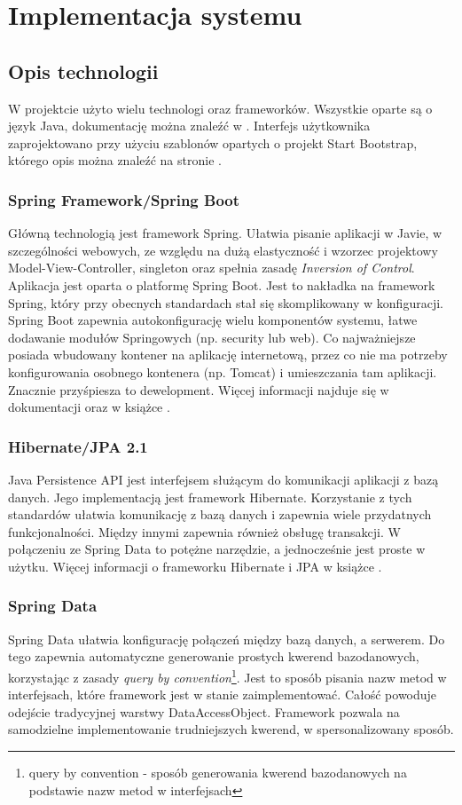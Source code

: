 \chapter{Implementacja systemu}
\thispagestyle{chapterBeginStyle}

\section{Opis technologii}
W projektcie użyto wielu technologi oraz frameworków. Wszystkie oparte są o język Java, dokumentację można znaleźć w \cite{Java-doc}. Interfejs użytkownika zaprojektowano przy użyciu szablonów opartych o projekt Start Bootstrap, którego opis można znaleźć na stronie \cite{sb}. 

\subsection{Spring Framework/Spring Boot}
Główną technologią jest framework Spring. Ułatwia pisanie aplikacji w Javie, w szczególności webowych, ze względu na dużą elastyczność i wzorzec projektowy Model-View-Controller, singleton oraz spełnia zasadę \textit{Inversion of Control}. Aplikacja jest oparta o platformę Spring Boot. Jest to nakładka na framework Spring, który przy obecnych standardach stał się skomplikowany w konfiguracji. Spring Boot zapewnia autokonfigurację wielu komponentów systemu, łatwe dodawanie modułów Springowych (np. security lub web). Co najważniejsze posiada wbudowany kontener na aplikację internetową, przez co nie ma potrzeby konfigurowania osobnego kontenera (np. Tomcat) i umieszczania tam aplikacji. Znacznie przyśpiesza to dewelopment. Więcej informacji najduje się w dokumentacji \cite{springb-docs} oraz w książce \cite{springbook}.

\subsection{Hibernate/JPA 2.1} 
Java Persistence API jest interfejsem służącym do komunikacji aplikacji z bazą danych. Jego implementacją jest framework Hibernate. Korzystanie z tych standardów ułatwia komunikację z bazą danych i zapewnia wiele przydatnych funkcjonalności. Między innymi zapewnia również obsługę transakcji. W połączeniu ze Spring Data to potężne narzędzie, a jednocześnie jest proste w użytku. Więcej informacji o frameworku Hibernate i JPA w książce \cite{JPA-hib}. 
\subsection{Spring Data}
Spring Data ułatwia konfigurację połączeń między bazą danych, a serwerem. Do tego zapewnia automatyczne generowanie prostych kwerend bazodanowych, korzystając z zasady \textit{query by convention}\footnote{query by convention - sposób generowania kwerend bazodanowych na podstawie nazw metod w interfejsach}. Jest to sposób pisania nazw metod w interfejsach, które framework jest w stanie zaimplementować. Całość powoduje odejście tradycyjnej warstwy DataAccessObject. Framework pozwala na samodzielne implementowanie trudniejszych kwerend, w spersonalizowany sposób. 

